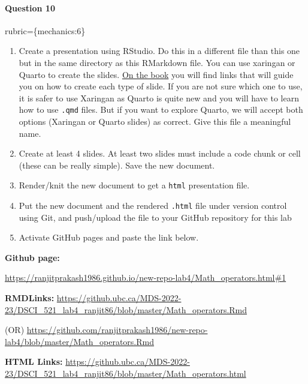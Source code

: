\documentclass[
]{article}
\providecommand{\tightlist}{%
  \setlength{\itemsep}{0pt}\setlength{\parskip}{0pt}}
\begin{document}
\begin{alert alert-info}
\hypertarget{question-10}{%
\paragraph{Question 10}\label{question-10}}

rubric=\{mechanics:6\}

\begin{enumerate}
\def\labelenumi{\arabic{enumi}.}
\tightlist
\item
  Create a presentation using RStudio. Do this in a different file than
  this one but in the same directory as this RMarkdown file. You can use
  xaringan or Quarto to create the slides.
  \href{https://pages.github.ubc.ca/MDS-2022-23/DSCI_521_platforms-dsci_students/materials/lectures/8-rmarkdown-quarto-slides-ghpages.html}{On
  the book} you will find links that will guide you on how to create
  each type of slide. If you are not sure which one to use, it is safer
  to use Xaringan as Quarto is quite new and you will have to learn how
  to use \texttt{.qmd} files. But if you want to explore Quarto, we will
  accept both options (Xaringan or Quarto slides) as correct. Give this
  file a meaningful name.
\item
  Create at least 4 slides. At least two slides must include a code
  chunk or cell (these can be really simple). Save the new document.
\item
  Render/knit the new document to get a \texttt{html} presentation file.
\item
  Put the new document and the rendered \texttt{.html} file under
  version control using Git, and push/upload the file to your GitHub
  repository for this lab
\item
  Activate GitHub pages and paste the link below.
\end{enumerate}
\end{alert alert-info}

\textbf{Github page:}

\url{https://ranjitprakash1986.github.io/new-repo-lab4/Math_operators.html\#1}

\textbf{RMDLinks:}
\url{https://github.ubc.ca/MDS-2022-23/DSCI_521_lab4_ranjit86/blob/master/Math_operators.Rmd}

(OR)
\url{https://github.com/ranjitprakash1986/new-repo-lab4/blob/master/Math_operators.Rmd}

\textbf{HTML Links:}
\url{https://github.ubc.ca/MDS-2022-23/DSCI_521_lab4_ranjit86/blob/master/Math_operators.html}
\end{document}
